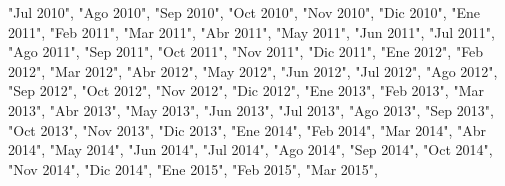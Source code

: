 \documentclass[
]{book}
\newenvironment{Shaded}{\begin{snugshade}}{\end{snugshade}}
\newcommand{\NormalTok}[1]{#1}
\newcommand{\StringTok}[1]{\textcolor[rgb]{0.31,0.60,0.02}{#1}}
\begin{document}
\begin{Shaded}
\begin{Highlighting}[]
                                   \StringTok{"Jul 2010"}\NormalTok{, }\StringTok{"Ago 2010"}\NormalTok{, }\StringTok{"Sep 2010"}\NormalTok{, }
                                   \StringTok{"Oct 2010"}\NormalTok{, }\StringTok{"Nov 2010"}\NormalTok{, }\StringTok{"Dic 2010"}\NormalTok{,}
                                   \StringTok{"Ene 2011"}\NormalTok{, }\StringTok{"Feb 2011"}\NormalTok{, }\StringTok{"Mar 2011"}\NormalTok{, }
                                   \StringTok{"Abr 2011"}\NormalTok{, }\StringTok{"May 2011"}\NormalTok{, }\StringTok{"Jun 2011"}\NormalTok{,}
                                   \StringTok{"Jul 2011"}\NormalTok{, }\StringTok{"Ago 2011"}\NormalTok{, }\StringTok{"Sep 2011"}\NormalTok{, }
                                   \StringTok{"Oct 2011"}\NormalTok{, }\StringTok{"Nov 2011"}\NormalTok{, }\StringTok{"Dic 2011"}\NormalTok{,}
                                   \StringTok{"Ene 2012"}\NormalTok{, }\StringTok{"Feb 2012"}\NormalTok{, }\StringTok{"Mar 2012"}\NormalTok{, }
                                   \StringTok{"Abr 2012"}\NormalTok{, }\StringTok{"May 2012"}\NormalTok{, }\StringTok{"Jun 2012"}\NormalTok{,}
                                   \StringTok{"Jul 2012"}\NormalTok{, }\StringTok{"Ago 2012"}\NormalTok{, }\StringTok{"Sep 2012"}\NormalTok{, }
                                   \StringTok{"Oct 2012"}\NormalTok{, }\StringTok{"Nov 2012"}\NormalTok{, }\StringTok{"Dic 2012"}\NormalTok{,}
                                   \StringTok{"Ene 2013"}\NormalTok{, }\StringTok{"Feb 2013"}\NormalTok{, }\StringTok{"Mar 2013"}\NormalTok{, }
                                   \StringTok{"Abr 2013"}\NormalTok{, }\StringTok{"May 2013"}\NormalTok{, }\StringTok{"Jun 2013"}\NormalTok{,}
                                   \StringTok{"Jul 2013"}\NormalTok{, }\StringTok{"Ago 2013"}\NormalTok{, }\StringTok{"Sep 2013"}\NormalTok{, }
                                   \StringTok{"Oct 2013"}\NormalTok{, }\StringTok{"Nov 2013"}\NormalTok{, }\StringTok{"Dic 2013"}\NormalTok{,}
                                   \StringTok{"Ene 2014"}\NormalTok{, }\StringTok{"Feb 2014"}\NormalTok{, }\StringTok{"Mar 2014"}\NormalTok{, }
                                   \StringTok{"Abr 2014"}\NormalTok{, }\StringTok{"May 2014"}\NormalTok{, }\StringTok{"Jun 2014"}\NormalTok{,}
                                   \StringTok{"Jul 2014"}\NormalTok{, }\StringTok{"Ago 2014"}\NormalTok{, }\StringTok{"Sep 2014"}\NormalTok{, }
                                   \StringTok{"Oct 2014"}\NormalTok{, }\StringTok{"Nov 2014"}\NormalTok{, }\StringTok{"Dic 2014"}\NormalTok{,}
                                   \StringTok{"Ene 2015"}\NormalTok{, }\StringTok{"Feb 2015"}\NormalTok{, }\StringTok{"Mar 2015"}\NormalTok{, }

\end{Highlighting}
\end{Shaded}
\end{document}
